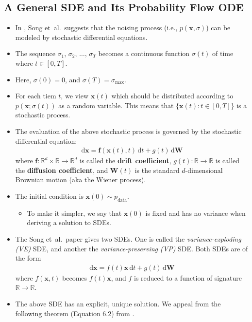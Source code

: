 \documentclass[10pt]{article}
\newcommand{\dee}{\mathrm{d}}
\newcommand{\ve}[1]{\mathbf{#1}}
\newcommand{\etal}{{et~al.}}
\newcommand{\Real}{\mathbb{R}}
\newcommand{\data}{\mathrm{data}}
\begin{document}
\subsection{A General SDE and Its Probability Flow ODE}

\begin{itemize}
  \item In \cite{Song:2021}, Song \etal\ suggests that the noising process (i.e., $p(\ve{x}, \sigma)$) can be modeled by stochastic differential equations.

  \item The sequence $\sigma_1$, $\sigma_2$, $\dotsc$, $\sigma_T$ becomes a continuous function $\sigma(t)$ of time where $t \in [0,T]$.
  \item Here, $\sigma(0) = 0$, and $\sigma(T) = \sigma_{\max}$.
  \item For each tiem $t$, we view $\ve{x}(t)$ which should be distributed according to $p(\ve{x}; \sigma(t))$ as a random variable. This means that $\{ \ve{x}(t) : t \in [0,T] \}$ is a stochastic process.
  \item The evaluation of the above stochastic process is governed by the stochastic differential equation:
  \begin{align*}
    \dee \ve{x} = \ve{f}(\ve{x}(t), t)\, \dee t + g(t)\, \dee \ve{W}
  \end{align*} 
  where $\ve{f}: \Real^d \times \Real \rightarrow \Real^d$ is called the {\bf drift coefficient}, $g(t): \Real \rightarrow \Real$ is called the {\bf diffusion coefficient}, and $\ve{W}(t)$ is the standard $d$-dimensional Brownian motion (aka the Wiener process).
  \item The initial condition is $\ve{x}(0) \sim p_{\data}$.
  \begin{itemize}
    \item To make it simpler, we say that $\ve{x}(0)$ is fixed and has no variance when deriving a solution to SDEs.
  \end{itemize}
  \item The Song \etal\ paper gives two SDEs. One is called the {\it variance-exploding (VE)} SDE, and another the {\it variance-preserving (VP)} SDE. Both SDEs are of the form
  \begin{align*}
    \dee \ve{x} = f(t)\ve{x}\, \dee t + g(t)\, \dee \ve{W}
  \end{align*}
  where $f(\ve{x},t)$ becomes $f(t)\ve{x}$, and $f$ is reduced to a function of signature $\Real \rightarrow \Real$.
  \item The above SDE has an explicit, unique solution. We appeal from the following theorem (Equation 6.2) from \cite{Sarkka:2019}.

\end{itemize}
\end{document}
